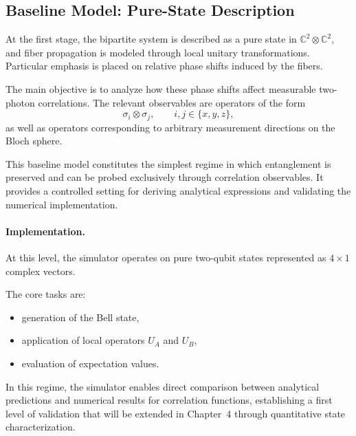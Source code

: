 \documentclass[a4paper]{article}
\begin{document}
\subsection{Baseline Model: Pure-State Description}

At the first stage, the bipartite system is described as a pure state in \( \mathbb{C}^2 \otimes \mathbb{C}^2 \), and fiber propagation is modeled through local unitary transformations. Particular emphasis is placed on relative phase shifts induced by the fibers.

\medskip

The main objective is to analyze how these phase shifts affect measurable two-photon correlations. The relevant observables are operators of the form
\[
\sigma_i \otimes \sigma_j,
\qquad i,j \in \{x,y,z\},
\]
as well as operators corresponding to arbitrary measurement directions on the Bloch sphere.

\medskip

This baseline model constitutes the simplest regime in which entanglement is preserved and can be probed exclusively through correlation observables. It provides a controlled setting for deriving analytical expressions and validating the numerical implementation.

\medskip

\paragraph{Implementation.}

At this level, the simulator operates on pure two-qubit states represented as \( 4 \times 1 \) complex vectors.

The core tasks are:
\begin{itemize}
\item generation of the Bell state,
\item application of local operators \( U_A \) and \( U_B \),
\item evaluation of expectation values.
\end{itemize}

In this regime, the simulator enables direct comparison between analytical predictions and numerical results for correlation functions, establishing a first level of validation that will be extended in Chapter~4 through quantitative state characterization.

\end{document}
